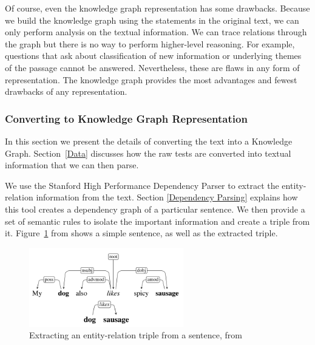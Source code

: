 \documentclass[pageno]{final_paper}
\begin{document}
Of course, even the knowledge graph representation has some drawbacks. Because
we build the knowledge graph using the statements in the original text, we can
only perform analysis on the textual information. We can trace relations through
the graph but there is no way to perform higher-level reasoning. For example,
questions that ask about classification of new information or underlying themes
of the passage cannot be answered. Nevertheless, these are flaws in any form of
representation. The knowledge graph provides the most advantages and fewest
drawbacks of any representation.

\subsubsection{Converting to Knowledge Graph Representation}
\label{Converting to Knowledge Graph Representation}

In this section we present the details of converting the text into a Knowledge
Graph. Section~\ref{Data} discusses how the raw tests are converted into textual
information that we can then parse.

We use the Stanford High Performance Dependency Parser \cite{Chen2014} to
extract the entity-relation information from the text. Section \ref{Dependency
Parsing} explains how this tool creates a dependency graph of a particular
sentence. We then provide a set of semantic rules to isolate the important
information and create a triple from it. Figure~\ref{fig: dependency extraction}
from \cite{Narasimhan2015} shows a simple sentence, as well as the extracted
triple.

\begin{figure}[!tb]
    \centering
    \includegraphics[width=0.6\textwidth,keepaspectratio]{figures/Dependency_Extraction.png}
    \caption{Extracting an entity-relation triple from a sentence, from \cite{Narasimhan2015}}
    \label{fig: dependency extraction}
\end{figure}
\end{document}
